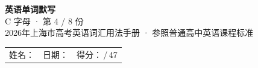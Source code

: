 \documentclass[10pt,a4paper]{article}
\begin{document}
\pagestyle{plain}

\begin{center}
{\LARGE\bfseries 英语单词默写}\\[0.22em]
{\large C 字母 · 第 4 / 8 份}\\[0.18em]
{\small 2026年上海市高考英语词汇用法手册 · 参照普通高中英语课程标准}
\end{center}

\vspace{0.25em}
\noindent\begin{tabular}{@{}p{}@{}p{}@{}p{}@{}}
姓名：\underline{\hspace{2.0cm}} & 日期：\underline{\hspace{2.0cm}} & 得分：\underline{\hspace{1.3cm}}\,/\,47 \\
\end{tabular}

\vspace{0.3em}

\vspace{0.08em}
\end{document}

